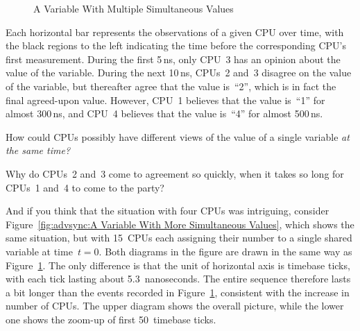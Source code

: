 \begin{figure}[htb]
\centering
{}
\caption{A Variable With Multiple Simultaneous Values}
\label{fig:advsync:A Variable With Multiple Simultaneous Values}
\end{figure}

Each horizontal bar represents the observations of a given CPU over time,
with the black regions to the left indicating the time before the
corresponding CPU's first measurement.
During the first 5\,ns, only CPU~3 has an opinion about the value of the
variable.
During the next 10\,ns, CPUs~2 and~3 disagree on the value of the variable,
but thereafter agree that the value is~``2'', which is in fact
the final agreed-upon value.
However, CPU~1 believes that the value is~``1'' for almost 300\,ns, and
CPU~4 believes that the value is~``4'' for almost 500\,ns.

\QuickQuiz{}
	How could CPUs possibly have different views of the
	value of a single variable \emph{at the same time?}
 \QuickQuizEnd

\QuickQuiz{}
	Why do CPUs~2 and~3 come to agreement so quickly, when it
	takes so long for CPUs~1 and~4 to come to the party?
 \QuickQuizEnd

And if you think that the situation with four CPUs was intriguing, consider
Figure~\ref{fig:advsync:A Variable With More Simultaneous Values},
which shows the same situation, but with 15~CPUs each assigning their
number to a single shared variable at time~$t=0$. Both diagrams in the
figure are drawn in the same way as 
Figure~\ref{fig:advsync:A Variable With Multiple Simultaneous Values}.
The only difference is that the unit of horizontal axis is timebase ticks,
with each tick lasting about 5.3~nanoseconds.
The entire sequence therefore lasts a bit longer than the events recorded in
Figure~\ref{fig:advsync:A Variable With Multiple Simultaneous Values},
consistent with the increase in number of CPUs.
The upper diagram shows the overall picture, while the lower one shows
the zoom-up of first 50~timebase ticks.


